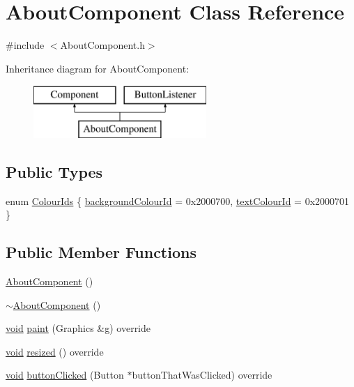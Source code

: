 \hypertarget{class_about_component}{}\section{About\+Component Class Reference}
\label{class_about_component}


{\ttfamily \#include $<$About\+Component.\+h$>$}

Inheritance diagram for About\+Component\+:\begin{figure}[H]
\begin{center}
\leavevmode
\includegraphics[height=2.000000cm]{class_about_component}
\end{center}
\end{figure}
\subsection*{Public Types}
\begin{DoxyCompactItemize}
\item 
enum \hyperlink{class_about_component_adac6eef89f47d0117da0f79f422e2f62}{Colour\+Ids} \{ \hyperlink{class_about_component_adac6eef89f47d0117da0f79f422e2f62ac6e56a04d1eef0a46cf4831b6d3caff0}{background\+Colour\+Id} = 0x2000700, 
\hyperlink{class_about_component_adac6eef89f47d0117da0f79f422e2f62af51a26ebd265fde96621b8a7398f3b61}{text\+Colour\+Id} = 0x2000701
 \}
\end{DoxyCompactItemize}
\subsection*{Public Member Functions}
\begin{DoxyCompactItemize}
\item 
\hyperlink{class_about_component_adfd6b751d7637bbd845e1e6ab874ec65}{About\+Component} ()
\item 
\hyperlink{class_about_component_a3a5957650ccd2427a90124832bb4555e}{$\sim$\+About\+Component} ()
\item 
\hyperlink{tk_8h_aba408b7cd755a96426e004c015f5de8e}{void} \hyperlink{class_about_component_ad76680827ff7c87d28a1f88d4870eedf}{paint} (Graphics \&g) override
\item 
\hyperlink{tk_8h_aba408b7cd755a96426e004c015f5de8e}{void} \hyperlink{class_about_component_aaa5fc1e5edb4051be9722b8d2a661a82}{resized} () override
\item 
\hyperlink{tk_8h_aba408b7cd755a96426e004c015f5de8e}{void} \hyperlink{class_about_component_acd2a7bcceaab84af892e437f68ae6cda}{button\+Clicked} (Button $\ast$button\+That\+Was\+Clicked) override
\end{DoxyCompactItemize}


